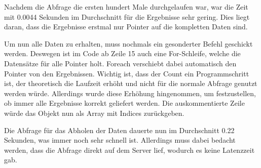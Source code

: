 Nachdem die Abfrage die ersten hundert Male durchgelaufen war, war die Zeit mit 0.0044 Sekunden im Durchschnitt für die Ergebnisse sehr gering. Dies liegt daran, dass die Ergebnisse erstmal nur Pointer auf die kompletten Daten sind. 

Um nun alle Daten zu erhalten, muss nochmals ein gesonderter Befehl geschickt werden. Deswegen ist im Code ab Zeile 15 auch eine For-Schleife, welche die Datensätze für alle Pointer holt. Foreach verschiebt dabei automatisch den Pointer von den Ergebnissen. Wichtig ist, dass der Count ein Programmschritt ist, der theoretisch die Laufzeit erhöht und nicht für die normale Abfrage genutzt werden würde. Allerdings wurde diese Erhöhung hingenommen, um festzustellen, ob immer alle Ergebnisse korrekt geliefert werden.
Die auskommentierte Zeile würde das Objekt nun als Array mit Indices zurückgeben. \cite{Xapian.25.2.2020}

Die Abfrage für das Abholen der Daten dauerte nun im Durchschnitt 0.22 Sekunden, was immer noch sehr schnell ist. Allerdings muss dabei bedacht werden, dass die Abfrage direkt auf dem Server lief, wodurch es keine Latenzzeit gab.
